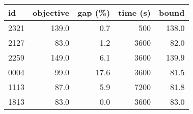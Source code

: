 \begin{tabular}{lrrrr}
\toprule
   id &  objective &  gap (\%) &  time (s) &  bound \\
\midrule
 2321 &      139.0 &      0.7 &       500 &  138.0 \\
 2127 &       83.0 &      1.2 &      3600 &   82.0 \\
 2259 &      149.0 &      6.1 &      3600 &  139.9 \\
 0004 &       99.0 &     17.6 &      3600 &   81.5 \\
 1113 &       87.0 &      5.9 &      7200 &   81.8 \\
 1813 &       83.0 &      0.0 &      3600 &   83.0 \\
\bottomrule
\end{tabular}
